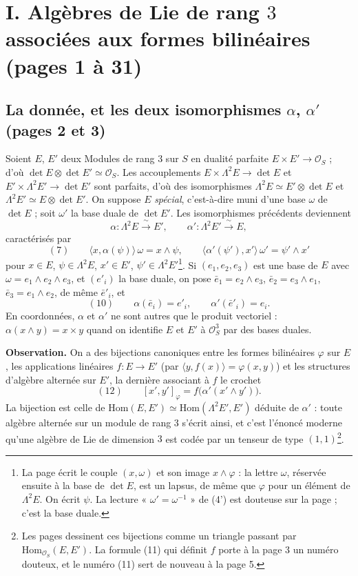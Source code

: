 \documentclass[11pt,a4paper]{article}
\begin{document}
\section*{I. Algèbres de Lie de rang $3$ associées aux formes bilinéaires (pages 1 à 31)}

\subsection*{La donnée, et les deux isomorphismes $\alpha$, $\alpha'$ (pages 2 et 3)}

Soient $E$, $E'$ deux Modules de rang $3$ sur $S$ en dualité parfaite
$E \times E' \to \mathcal{O}_S$ ; d'où $\det E \otimes \det E' \simeq \mathcal{O}_S$. Les
accouplements $E \times \Lambda^2 E \to \det E$ et $E' \times \Lambda^2 E' \to \det E'$
sont parfaits, d'où des isomorphismes
$\Lambda^2 E \simeq E' \otimes \det E$ et $\Lambda^2 E' \simeq E \otimes \det E'$. On
suppose $E$ \emph{spécial}, c'est-à-dire muni d'une base $\omega$ de $\det E$ ; soit
$\omega'$ la base duale de $\det E'$. Les isomorphismes précédents deviennent
\[
  \alpha : \Lambda^2 E \xrightarrow{\ \sim\ } E', \qquad
  \alpha' : \Lambda^2 E' \xrightarrow{\ \sim\ } E,
\]
caractérisés par
\[
  (7) \qquad \langle x, \alpha(\psi) \rangle\, \omega = x \wedge \psi , \qquad
  \langle \alpha'(\psi'), x' \rangle\, \omega' = \psi' \wedge x'
\]
pour $x \in E$, $\psi \in \Lambda^2 E$, $x' \in E'$, $\psi' \in \Lambda^2 E'$\footnote{La
page écrit le couple $(x, \omega)$ et son image $x \wedge \varphi$ : la lettre
$\omega$, réservée ensuite à la base de $\det E$, est un lapsus, de même que
$\varphi$ pour un élément de $\Lambda^2 E$. On écrit $\psi$. La lecture
« $\omega' = \omega^{-1}$ » de (4') est douteuse sur la page ; c'est la base duale.}.
Si $(e_1, e_2, e_3)$ est une base de $E$ avec $\omega = e_1 \wedge e_2 \wedge e_3$, et
$(e'_i)$ la base duale, on pose $\bar{e}_1 = e_2 \wedge e_3$,
$\bar{e}_2 = e_3 \wedge e_1$, $\bar{e}_3 = e_1 \wedge e_2$, de même $\bar{e}'_i$, et
\[
  (10) \qquad \alpha(\bar{e}_i) = e'_i , \qquad \alpha'(\bar{e}'_i) = e_i .
\]
En coordonnées, $\alpha$ et $\alpha'$ ne sont autres que le produit vectoriel :
$\alpha(x \wedge y) = x \times y$ quand on identifie $E$ et $E'$ à
$\mathcal{O}_S^3$ par des bases duales.

\textbf{Observation.} On a des bijections canoniques entre les formes
bilinéaires $\varphi$ sur $E$, les applications linéaires $f : E \to E'$ (par
$\langle y, f(x) \rangle = \varphi(x, y)$) et les structures d'algèbre alternée
sur $E'$, la dernière associant à $f$ le crochet
\[
  (12) \qquad [x', y']_{\varphi} = f\bigl(\alpha'(x' \wedge y')\bigr) .
\]
La bijection est celle de $\mathrm{Hom}(E, E') \simeq \mathrm{Hom}(\Lambda^2 E', E')$
déduite de $\alpha'$ : toute algèbre alternée sur un module de rang $3$ s'écrit
ainsi, et c'est l'énoncé moderne qu'une algèbre de Lie de dimension $3$ est
codée par un tenseur de type $(1,1)$\footnote{Les pages dessinent ces bijections
comme un triangle passant par $\mathrm{Hom}_{\mathcal{O}_S}(E, E')$. La formule (11) qui
définit $f$ porte à la page 3 un numéro douteux, et le numéro (11) sert de
nouveau à la page 5.}.
\end{document}
